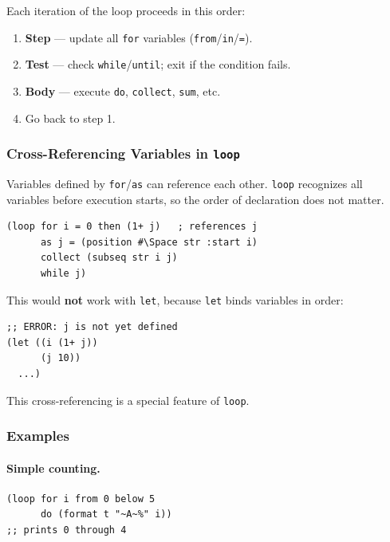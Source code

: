 Each iteration of the loop proceeds in this order:

\begin{enumerate}
  \item \textbf{Step} --- update all \texttt{for} variables
        (\texttt{from}/\texttt{in}/\texttt{=}).
  \item \textbf{Test} --- check \texttt{while}/\texttt{until}; exit if
        the condition fails.
  \item \textbf{Body} --- execute \texttt{do}, \texttt{collect},
        \texttt{sum}, etc.
  \item Go back to step 1.
\end{enumerate}

\subsubsection{Cross-Referencing Variables in \texttt{loop}}

Variables defined by \texttt{for}/\texttt{as} can reference each other.
\texttt{loop} recognizes all variables before execution starts,
so the order of declaration does not matter.

\begin{lstlisting}
(loop for i = 0 then (1+ j)   ; references j
      as j = (position #\Space str :start i)
      collect (subseq str i j)
      while j)
\end{lstlisting}

This would \textbf{not} work with \texttt{let}, because \texttt{let}
binds variables in order:

\begin{lstlisting}
;; ERROR: j is not yet defined
(let ((i (1+ j))
      (j 10))
  ...)
\end{lstlisting}

This cross-referencing is a special feature of \texttt{loop}.

\subsubsection{Examples}

\paragraph{Simple counting.}

\begin{lstlisting}
(loop for i from 0 below 5
      do (format t "~A~%" i))
;; prints 0 through 4
\end{lstlisting}

